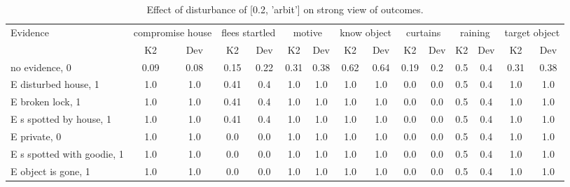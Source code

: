 \begin{table}\begin{tabular}{l|cc|cc|cc|cc|cc|cc|cc}\toprule\multirow{2}{*}{Evidence} & \multicolumn{2}{c}{compromise house}& \multicolumn{2}{c}{flees startled}& \multicolumn{2}{c}{motive}& \multicolumn{2}{c}{know object}& \multicolumn{2}{c}{curtains}& \multicolumn{2}{c}{raining}& \multicolumn{2}{c}{target object}\\& {K2} & {Dev}& {K2} & {Dev}& {K2} & {Dev}& {K2} & {Dev}& {K2} & {Dev}& {K2} & {Dev}& {K2} & {Dev}\\\midrule
no evidence, 0 & 0.09&0.08&\cellcolor{Bittersweet}0.15&\cellcolor{Bittersweet}0.22&\cellcolor{Bittersweet}0.31&\cellcolor{Bittersweet}0.38&0.62&0.64&0.19&0.2&\cellcolor{Bittersweet}0.5&\cellcolor{Bittersweet}0.4&\cellcolor{Bittersweet}0.31&\cellcolor{Bittersweet}0.38\\E disturbed house, 1 & 1.0&1.0&0.41&0.4&1.0&1.0&1.0&1.0&0.0&0.0&\cellcolor{Bittersweet}0.5&\cellcolor{Bittersweet}0.4&1.0&1.0\\E broken lock, 1 & 1.0&1.0&0.41&0.4&1.0&1.0&1.0&1.0&0.0&0.0&\cellcolor{Bittersweet}0.5&\cellcolor{Bittersweet}0.4&1.0&1.0\\E s spotted by house, 1 & 1.0&1.0&0.41&0.4&1.0&1.0&1.0&1.0&0.0&0.0&\cellcolor{Bittersweet}0.5&\cellcolor{Bittersweet}0.4&1.0&1.0\\E private, 0 & 1.0&1.0&0.0&0.0&1.0&1.0&1.0&1.0&0.0&0.0&\cellcolor{Bittersweet}0.5&\cellcolor{Bittersweet}0.4&1.0&1.0\\E s spotted with goodie, 1 & 1.0&1.0&0.0&0.0&1.0&1.0&1.0&1.0&0.0&0.0&\cellcolor{Bittersweet}0.5&\cellcolor{Bittersweet}0.4&1.0&1.0\\E object is gone, 1 & 1.0&1.0&0.0&0.0&1.0&1.0&1.0&1.0&0.0&0.0&\cellcolor{Bittersweet}0.5&\cellcolor{Bittersweet}0.4&1.0&1.0\\\bottomrule\end{tabular}\caption{Effect of disturbance of [0.2, 'arbit'] on strong view of outcomes.}\end{table}
